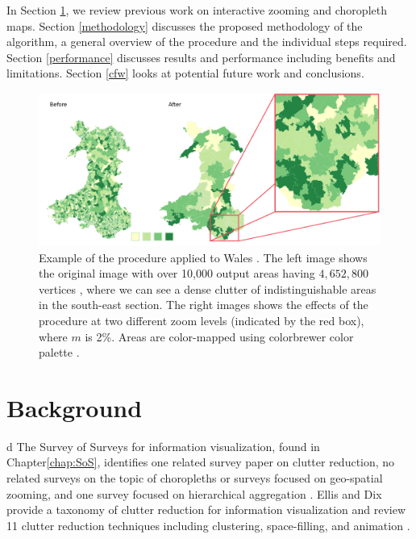In Section \ref{relatedWork}, we review previous work on interactive zooming and choropleth maps. Section \ref{methodology} discusses the proposed methodology of the algorithm, a general overview of the procedure and the individual steps required. Section \ref{performance} discusses results and performance including benefits and limitations. Section \ref{cfw} looks at potential future work and conclusions.

\begin{figure}[t]
\centering
\includegraphics[width=1\linewidth]{images/Zooming3}
\caption{Example of the procedure applied to Wales \cite{wales}. The left image shows the original image with over 10,000 output areas having $4,652,800$ vertices \cite{vickers2007creating}, where we can see a dense clutter of indistinguishable areas in the south-east section. The right images shows the effects of the procedure at two different zoom levels (indicated by the red box), where $m$ is 2\%. Areas are color-mapped using colorbrewer color palette \cite{colorbrewer}. } \label{fig:zoomingExample} \vspace{0.2cm}
\end{figure}

\section{Background} \label{relatedWork}
d The Survey of Surveys for information visualization, found in Chapter\ref{chap:SoS}, identifies one related survey paper on clutter reduction, no related surveys on the topic of choropleths or surveys focused on geo-spatial zooming, and one survey focused on hierarchical aggregation \cite{elmqvist2010hierarchical}. Ellis and Dix provide a taxonomy of clutter reduction for information visualization and review 11 clutter reduction techniques including clustering, space-filling, and animation \cite{ellis2007taxonomy}.

